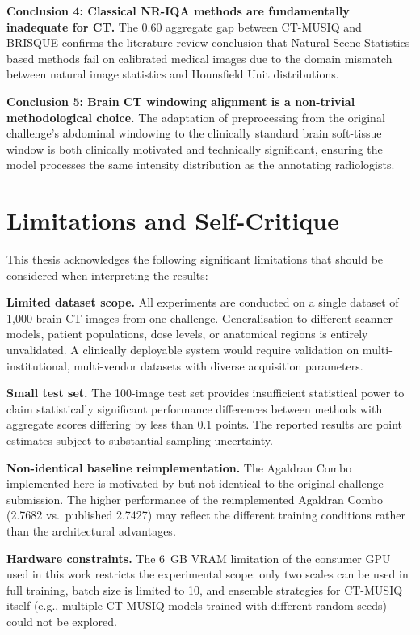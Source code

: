 \textbf{Conclusion 4: Classical NR-IQA methods are fundamentally inadequate for CT.}
The 0.60 aggregate gap between CT-MUSIQ and BRISQUE confirms the literature review
conclusion that Natural Scene Statistics-based methods fail on calibrated medical images
due to the domain mismatch between natural image statistics and Hounsfield Unit
distributions.

\textbf{Conclusion 5: Brain CT windowing alignment is a non-trivial methodological
choice.} The adaptation of preprocessing from the original challenge's abdominal
windowing to the clinically standard brain soft-tissue window is both clinically
motivated and technically significant, ensuring the model processes the same intensity
distribution as the annotating radiologists.


\section{Limitations and Self-Critique}
\label{sec:conc_limitations}

This thesis acknowledges the following significant limitations that should be considered
when interpreting the results:

\textbf{Limited dataset scope.} All experiments are conducted on a single dataset of
1,000 brain CT images from one challenge. Generalisation to different scanner models,
patient populations, dose levels, or anatomical regions is entirely unvalidated. A
clinically deployable system would require validation on multi-institutional, multi-vendor
datasets with diverse acquisition parameters.

\textbf{Small test set.} The 100-image test set provides insufficient statistical power
to claim statistically significant performance differences between methods with aggregate
scores differing by less than 0.1 points. The reported results are point estimates subject
to substantial sampling uncertainty.

\textbf{Non-identical baseline reimplementation.} The Agaldran Combo implemented here
is motivated by but not identical to the original challenge submission. The higher
performance of the reimplemented Agaldran Combo (2.7682 vs.\ published 2.7427) may
reflect the different training conditions rather than the architectural advantages.

\textbf{Hardware constraints.} The 6~GB VRAM limitation of the consumer GPU used in
this work restricts the experimental scope: only two scales can be used in full training,
batch size is limited to 10, and ensemble strategies for CT-MUSIQ itself (e.g., multiple
CT-MUSIQ models trained with different random seeds) could not be explored.


